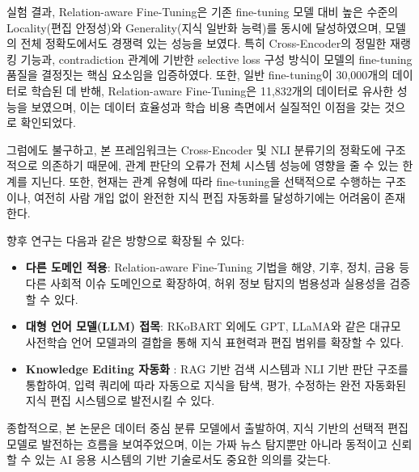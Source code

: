 \documentclass[a4paper,fleqn]{cas-sc}
\begin{document}
실험 결과, Relation-aware Fine-Tuning은 기존 fine-tuning 모델 대비 높은 수준의 Locality(편집 안정성)와 Generality(지식 일반화 능력)를 동시에 달성하였으며, 모델의 전체 정확도에서도 경쟁력 있는 성능을 보였다. 특히 Cross-Encoder의 정밀한 재랭킹 기능과, contradiction 관계에 기반한 selective loss 구성 방식이 모델의 fine-tuning 품질을 결정짓는 핵심 요소임을 입증하였다. 또한, 일반 fine-tuning이 30,000개의 데이터로 학습된 데 반해, Relation-aware Fine-Tuning은 11,832개의 데이터로 유사한 성능을 보였으며, 이는 데이터 효율성과 학습 비용 측면에서 실질적인 이점을 갖는 것으로 확인되었다.

그럼에도 불구하고, 본 프레임워크는 Cross-Encoder 및 NLI 분류기의 정확도에 구조적으로 의존하기 때문에, 관계 판단의 오류가 전체 시스템 성능에 영향을 줄 수 있는 한계를 지닌다. 또한, 현재는 관계 유형에 따라 fine-tuning을 선택적으로 수행하는 구조이나, 여전히 사람 개입 없이 완전한 지식 편집 자동화를 달성하기에는 어려움이 존재한다.

향후 연구는 다음과 같은 방향으로 확장될 수 있다:


\begin{itemize}
    \item{\textbf{다른 도메인 적용}: Relation-aware Fine-Tuning 기법을 해양, 기후, 정치, 금융 등 다른 사회적 이슈 도메인으로 확장하여, 허위 정보 탐지의 범용성과 실용성을 검증할 수 있다.}
    \item{\textbf{대형 언어 모델(LLM) 접목}: RKoBART 외에도 GPT, LLaMA와 같은 대규모 사전학습 언어 모델과의 결합을 통해 지식 표현력과 편집 범위를 확장할 수 있다.}
    \item{\textbf{Knowledge Editing 자동화 }: RAG 기반 검색 시스템과 NLI 기반 판단 구조를 통합하여, 입력 쿼리에 따라 자동으로 지식을 탐색, 평가, 수정하는 완전 자동화된 지식 편집 시스템으로 발전시킬 수 있다.}
    
\end{itemize}

종합적으로, 본 논문은 데이터 중심 분류 모델에서 출발하여, 지식 기반의 선택적 편집 모델로 발전하는 흐름을 보여주었으며, 이는 가짜 뉴스 탐지뿐만 아니라 동적이고 신뢰할 수 있는 AI 응용 시스템의 기반 기술로서도 중요한 의의를 갖는다.
\clearpage

\printcredits


%
%
\end{document}
